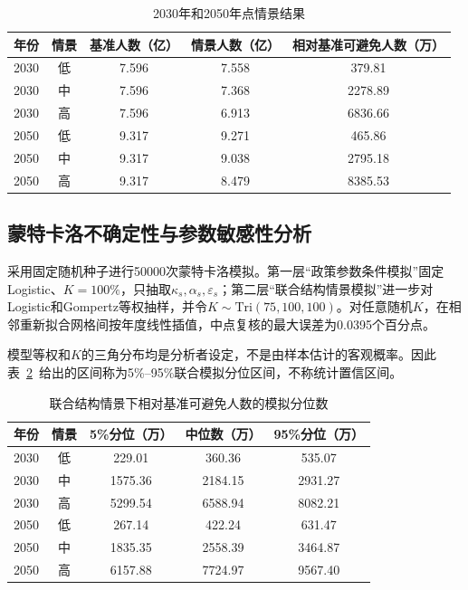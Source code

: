 \begin{table}[H]
\centering
\small
\caption{2030年和2050年点情景结果}
\label{tab:q4-scenario-results}
\begin{tabular}{ccccc}
\toprule
年份 & 情景 & 基准人数（亿） & 情景人数（亿） & 相对基准可避免人数（万） \\
\midrule
2030 & 低 & 7.596 & 7.558 & 379.81 \\
2030 & 中 & 7.596 & 7.368 & 2278.89 \\
2030 & 高 & 7.596 & 6.913 & 6836.66 \\
2050 & 低 & 9.317 & 9.271 & 465.86 \\
2050 & 中 & 9.317 & 9.038 & 2795.18 \\
2050 & 高 & 9.317 & 8.479 & 8385.53 \\
\bottomrule
\end{tabular}
\end{table}

\subsection{蒙特卡洛不确定性与参数敏感性分析}

采用固定随机种子进行50000次蒙特卡洛模拟。第一层“政策参数条件模拟”固定Logistic、$K=100\%$，只抽取$\kappa_s,\alpha_s,\varepsilon_s$；第二层“联合结构情景模拟”进一步对Logistic和Gompertz等权抽样，并令$K\sim\mathrm{Tri}(75,100,100)$。对任意随机$K$，在相邻重新拟合网格间按年度线性插值，中点复核的最大误差为0.0395个百分点。

模型等权和$K$的三角分布均是分析者设定，不是由样本估计的客观概率。因此表~\ref{tab:q4-mc-results}~给出的区间称为5\%--95\%联合模拟分位区间，不称统计置信区间。

\begin{table}[H]
\centering
\small
\caption{联合结构情景下相对基准可避免人数的模拟分位数}
\label{tab:q4-mc-results}
\begin{tabular}{ccccc}
\toprule
年份 & 情景 & 5\%分位（万） & 中位数（万） & 95\%分位（万） \\
\midrule
2030 & 低 & 229.01 & 360.36 & 535.07 \\
2030 & 中 & 1575.36 & 2184.15 & 2931.27 \\
2030 & 高 & 5299.54 & 6588.94 & 8082.21 \\
2050 & 低 & 267.14 & 422.24 & 631.47 \\
2050 & 中 & 1835.35 & 2558.39 & 3464.87 \\
2050 & 高 & 6157.88 & 7724.97 & 9567.40 \\
\bottomrule
\end{tabular}
\end{table}

